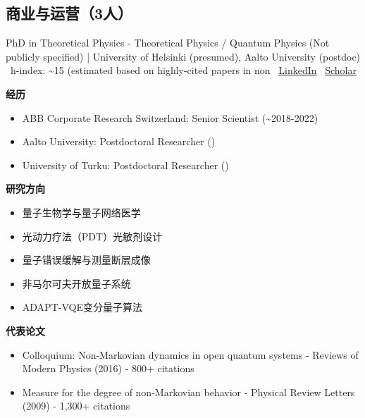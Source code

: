 \subsection{商业与运营（3人）}
\vspace{4pt}
\par{\footnotesize\color{graytext}PhD in Theoretical Physics - Theoretical Physics / Quantum Physics (Not publicly specified) | University of Helsinki (presumed), Aalto University (postdoc) \textbar\  h-index: \textasciitilde{}15 (estimated based on highly-cited papers in non \textbar\  \href{https://www.linkedin.com/in/elsi-mari-borrelli/}{LinkedIn} \textbar\  \href{https://scholar.google.com/citations?user=J9G1CR8AAAAJ}{Scholar}}
\par{\footnotesize\color{mainred}\textbf{经历}}
\begin{itemize}[leftmargin=1.2em,itemsep=0pt,topsep=0pt]
\item {\footnotesize ABB Corporate Research Switzerland: Senior Scientist (\textasciitilde{}2018-2022)}
\item {\footnotesize Aalto University: Postdoctoral Researcher ()}
\item {\footnotesize University of Turku: Postdoctoral Researcher ()}
\end{itemize}
\par{\footnotesize\color{mainred}\textbf{研究方向}}
\begin{itemize}[leftmargin=1.2em,itemsep=0pt,topsep=0pt]
\item {\footnotesize 量子生物学与量子网络医学}
\item {\footnotesize 光动力疗法（PDT）光敏剂设计}
\item {\footnotesize 量子错误缓解与测量断层成像}
\item {\footnotesize 非马尔可夫开放量子系统}
\item {\footnotesize ADAPT-VQE变分量子算法}
\end{itemize}
\par{\footnotesize\color{mainred}\textbf{代表论文}}
\begin{itemize}[leftmargin=1.2em,itemsep=0pt,topsep=0pt]
\item {\footnotesize Colloquium: Non-Markovian dynamics in open quantum systems - Reviews of Modern Physics (2016) - 800+ citations}
\item {\footnotesize Measure for the degree of non-Markovian behavior - Physical Review Letters (2009) - 1,300+ citations}
\end{itemize}
